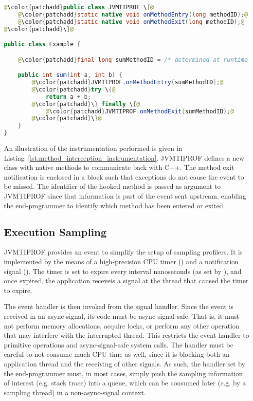 \begin{lstlisting}[language=Java, escapechar=@, caption=Example instrumentation applied by method interception. Instrumented code is in green. The \code{sum} method is modified such that JVMTIPROF is notified about entries and exits on it.,label=lst:method_interception_instrumentation]
@\color{patchadd}public class JVMTIPROF \{@
    @\color{patchadd}static native void onMethodEntry(long methodID);@
    @\color{patchadd}static native void onMethodExit(long methodID);@
@\color{patchadd}\}@

public class Example {

    @\color{patchadd}final long sumMethodID = /* determined at runtime */;@

    public int sum(int a, int b) {
        @\color{patchadd}JVMTIPROF.onMethodEntry(sumMethodID);@
        @\color{patchadd}try \{@
            return a + b;
        @\color{patchadd}\} finally \{@
            @\color{patchadd}JVMTIPROF.onMethodExit(sumMethodID);@
        @\color{patchadd}\}@
    }
}
\end{lstlisting}

An illustration of the instrumentation performed is given in Listing~\ref{lst:method_interception_instrumentation}. JVMTIPROF defines a new class with native methods to communicate back with C++. The method exit notification is enclosed in a  block such that exceptions do not cause the event to be missed. The identifier of the hooked method is passed as argument to JVMTIPROF since that information is part of the event sent upstream, enabling the end-programmer to identify which method has been entered or exited.





\subsection{Execution Sampling}

JVMTIPROF provides an event to simplify the setup of sampling profilers. It is implemented by the means of a high-precision CPU timer () and a notification signal (). The timer is set to expire every interval nanoseconds (as set by ), and once expired, the application receveis a signal at the thread that caused the timer to expire.

The event handler is then invoked from the signal handler. Since the event is received in an async-signal, its code must be async-signal-safe. That is, it must not perform memory allocations, acquire locks, or perform any other operation that may interfere with the interrupted thread. This restricts the event handler to primitive operations and async-signal-safe system calls. The handler must be careful to not consume much CPU time as well, since it is blocking both an application thread and the receiving of other signals. As such, the handler set by the end-programmer must, in most cases, simply push the sampling information of interest (e.g. stack trace) into a queue, which can be consumed later (e.g. by a sampling thread) in a non-async-signal context.

